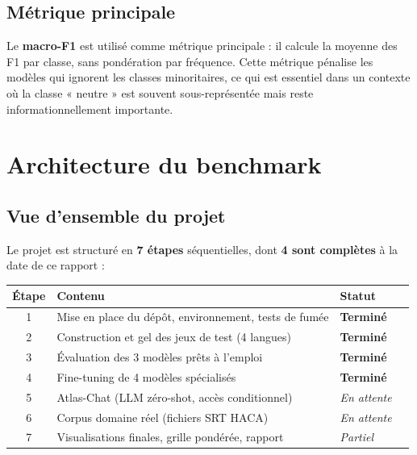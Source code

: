\documentclass[12pt, a4paper]{article}
\begin{document}
\subsection{Métrique principale}

Le \textbf{macro-F1} est utilisé comme métrique principale : il calcule la
moyenne des F1 par classe, sans pondération par fréquence. Cette métrique
pénalise les modèles qui ignorent les classes minoritaires, ce qui est
essentiel dans un contexte où la classe « neutre » est souvent sous-représentée
mais reste informationnellement importante.

\section{Architecture du benchmark}

\subsection{Vue d'ensemble du projet}

Le projet est structuré en \textbf{7 étapes} séquentielles, dont
\textbf{4 sont complètes} à la date de ce rapport :

\begin{center}
\begin{tabular}{clll}
\toprule
\textbf{Étape} & \textbf{Contenu} & \textbf{Statut} \\
\midrule
1 & Mise en place du dépôt, environnement, tests de fumée & \textcolor{goodgreen}{\textbf{Terminé}} \\
2 & Construction et gel des jeux de test (4 langues) & \textcolor{goodgreen}{\textbf{Terminé}} \\
3 & Évaluation des 3 modèles prêts à l'emploi & \textcolor{goodgreen}{\textbf{Terminé}} \\
4 & Fine-tuning de 4 modèles spécialisés & \textcolor{goodgreen}{\textbf{Terminé}} \\
5 & Atlas-Chat (LLM zéro-shot, accès conditionnel) & \textcolor{warnorange}{\textit{En attente}} \\
6 & Corpus domaine réel (fichiers SRT HACA) & \textcolor{warnorange}{\textit{En attente}} \\
7 & Visualisations finales, grille pondérée, rapport & \textcolor{warnorange}{\textit{Partiel}} \\
\bottomrule
\end{tabular}
\end{center}
\end{document}
